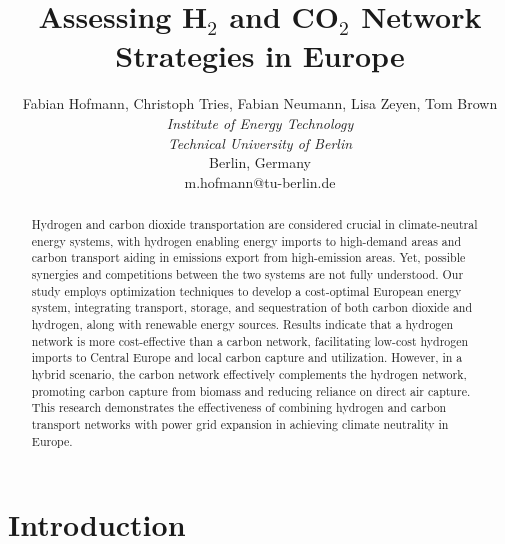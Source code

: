 \documentclass[twocolumn]{article}
\newcommand{\COtwo}{CO$_2$}
\newcommand{\Htwo}{H$_2$}
\begin{document}

\title{Assessing \Htwo{} and \COtwo{} Network Strategies in Europe}

\author{
    Fabian Hofmann, Christoph Tries, Fabian Neumann, Lisa Zeyen, Tom Brown \\
    \textit{Institute of Energy Technology} \\
    \textit{Technical University of Berlin}\\
    Berlin, Germany \\
    m.hofmann@tu-berlin.de
}


\maketitle

\begin{abstract}
    Hydrogen and carbon dioxide transportation are considered crucial in climate-neutral energy systems, with hydrogen enabling energy imports to high-demand areas and carbon transport aiding in emissions export from high-emission areas. Yet, possible synergies and competitions between the two systems are not fully understood. Our study employs optimization techniques to develop a cost-optimal European energy system, integrating transport, storage, and sequestration of both carbon dioxide and hydrogen, along with renewable energy sources. Results indicate that a hydrogen network is more cost-effective than a carbon network, facilitating low-cost hydrogen imports to Central Europe and local carbon capture and utilization. However, in a hybrid scenario, the carbon network effectively complements the hydrogen network, promoting carbon capture from biomass and reducing reliance on direct air capture. This research demonstrates the effectiveness of combining hydrogen and carbon transport networks with power grid expansion in achieving climate neutrality in Europe.
\end{abstract}


\section{Introduction}
\end{document}
